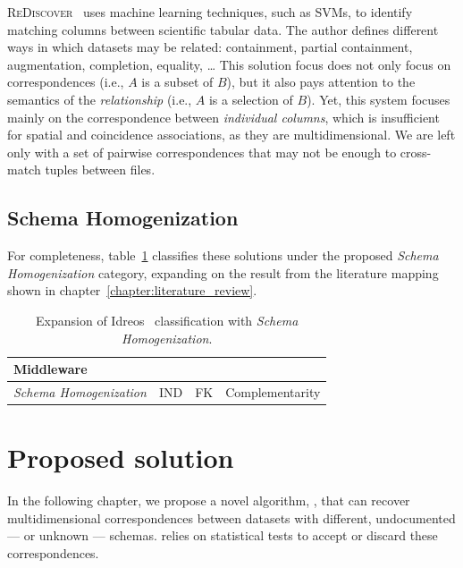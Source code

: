 \textsc{ReDiscover}~\cite{alawini2016} uses machine learning techniques, such as
\glspl{SVM}, to identify matching columns between scientific tabular data.
The author defines different ways in which datasets may be related:
containment, partial containment, augmentation, completion, equality, \ldots
This solution focus does not only focus on correspondences (i.e., $A$ is a subset of $B$),
but it also pays attention to the semantics of the \emph{relationship} (i.e., $A$
is a selection of $B$).
Yet, this system focuses mainly on the correspondence between \emph{individual columns},
which is insufficient for spatial and coincidence associations, as they are multidimensional.
We are left only with a set of pairwise correspondences that may not be enough to cross-match
tuples between files.

\subsection{Schema Homogenization}
\label{sec:schema_homogeneization}

For completeness, table~\ref{tab:missing_middleware} classifies these solutions
under the proposed \emph{Schema Homogenization} category,
expanding on the result from the literature mapping shown in chapter~\ref{chapter:literature_review}.

\begin{table}[ht]
    \centering
    \begin{tabularx}{\linewidth}{p{7em} >{\raggedright}X >{\raggedright}X X}
    \hline
    \multicolumn{4}{l}{\textbf{Middleware}} \\
    \hline
    \textit{Schema \mbox{Homogenization}} &
    \gls{IND}     \cite{DeMarchi2002,DeMarchi2003zigzag,koeller2002integration} &
    \gls{FK}      \cite{Rostin2009,Zhang2010,jiang_holistic_2020} &
    Complementarity \cite{alawini2016} \\
    \hline
    \end{tabularx}
    \caption[Articles under Schema Homogenization.]{
    Expansion of Idreos~\cite{Idreos2015} classification with \emph{Schema Homogenization}.}
    \label{tab:missing_middleware}
\end{table}


\section{Proposed solution}
\label{sec:gaps/proposed}
In the following chapter, we propose a novel algorithm, \PresQ, that
can recover multidimensional correspondences between datasets with different,
undocumented --- or unknown --- schemas. \PresQ relies on statistical tests to
accept or discard these correspondences.

